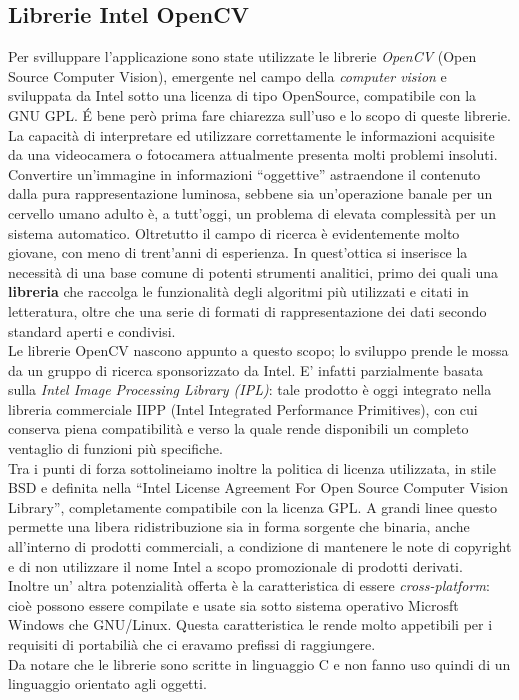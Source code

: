 \subsection{Librerie Intel OpenCV}
Per svilluppare l'applicazione sono state utilizzate le librerie \textit{OpenCV} (Open Source Computer Vision), emergente nel campo della \textit{computer vision}  e sviluppata da Intel sotto una licenza di tipo OpenSource, compatibile con la GNU GPL.
\'E bene però prima fare chiarezza sull'uso e lo scopo di queste librerie.\\
La capacità di interpretare ed utilizzare correttamente le informazioni acquisite da una videocamera o fotocamera attualmente presenta molti problemi insoluti. Convertire un’immagine in informazioni “oggettive” astraendone il contenuto dalla pura rappresentazione luminosa, sebbene sia un’operazione banale per un cervello umano adulto è, a tutt’oggi, un problema di elevata complessità per un sistema automatico.
Oltretutto il campo di ricerca è evidentemente molto giovane, con meno di trent’anni di esperienza. In quest’ottica si inserisce la necessità di una base comune di potenti strumenti analitici, primo dei quali una \textbf{libreria} che raccolga le funzionalità degli algoritmi più utilizzati e citati in letteratura, oltre che una serie di formati di rappresentazione dei dati secondo standard aperti e condivisi.\\
Le librerie OpenCV  nascono appunto a questo scopo; lo sviluppo prende le mossa da un gruppo di ricerca sponsorizzato da Intel. E’ infatti parzialmente basata sulla \textit{Intel Image Processing Library (IPL)}: tale prodotto è oggi integrato nella libreria commerciale IIPP (Intel Integrated Performance Primitives), con cui conserva piena compatibilità e verso la quale rende disponibili un completo ventaglio di funzioni più specifiche.\\
Tra i punti di forza sottolineiamo inoltre la politica di licenza utilizzata, in stile BSD e definita nella ``Intel License Agreement For Open Source Computer Vision Library'', completamente compatibile con la licenza GPL. A grandi linee questo permette una libera ridistribuzione sia in forma sorgente che binaria, anche all’interno di prodotti commerciali, a condizione di mantenere le note di copyright e di non utilizzare il nome Intel a scopo promozionale di prodotti derivati.\\
Inoltre un' altra potenzialità offerta è la caratteristica di essere \textit{cross-platform}: cioè possono essere compilate e usate sia sotto sistema operativo Microsft Windows che GNU/Linux. Questa caratteristica le rende molto appetibili per i requisiti di portabilià che ci eravamo prefissi di raggiungere.\\ Da notare che le librerie sono scritte in linguaggio C e non fanno uso quindi di un linguaggio orientato agli oggetti.

